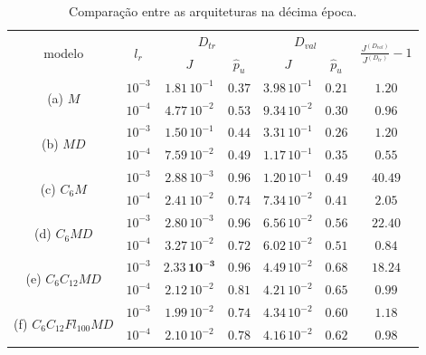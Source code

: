 \begin{table}[ht]
	\begin{center}
		\caption{Comparação entre as arquiteturas na décima época.}
		\label{tab:dinamica_inicial}
		\begin{tabular}{ |c|c|c|c|c|c|c| }
			\hline
			\multirow{2}{*}{modelo} & 
			\multirow{2}{*}{$l_r$} & 
			\multicolumn{2}{c|}{$D_{tr}$} &
			\multicolumn{2}{c|}{$D_{val}$} &
			\multirow{2}{*}{$\frac{J^{(D_{val})}}{J^{(D_{tr})}} - 1$}   \\ \cline{3-6}
			&  & $J$ & $\hat{p}_u$ & $J$ & $\hat{p}_u$  &  \\[2pt]
			\hline\hline
			\multirow{2}{*}{(a) $M$}
			& $10^{-3}$ & $1.81\,10^{-1}$ & $0.37$ & $3.98\,10^{-1}$ & $0.21$ & $1.20$ \\ \cline{2-7}
			& $10^{-4}$ & $4.77\,10^{-2}$ & $0.53$ & $9.34\,10^{-2}$ & $0.30$ & $0.96$ \\ \cline{2-7}
			
			\hline\hline
			\multirow{2}{*}{(b) $MD$}
			& $10^{-3}$ & $1.50\,10^{-1}$ & $0.44$ & $3.31\,10^{-1}$ & $0.26$ & $1.20$ \\ \cline{2-7}
			& $10^{-4}$ & $7.59\,10^{-2}$ & $0.49$ & $1.17\,10^{-1}$ & $0.35$ & $0.55$ \\ \cline{2-7}
			
			\hline\hline
			\multirow{2}{*}{(c) $C_6M$}
			& $10^{-3}$ & $2.88\,10^{-3}$ & $\mathbf{0.96}$ & $1.20\,10^{-1}$ & $0.49$ & $40.49$ \\ \cline{2-7}
			& $10^{-4}$ & $2.41\,10^{-2}$ & $0.74$ & $7.34\,10^{-2}$ & $0.41$ & $2.05$ \\ \cline{2-7}
			
			\hline\hline
			\multirow{2}{*}{(d) $C_6MD$}
			& $10^{-3}$ & $2.80\,10^{-3}$ & $\mathbf{0.96}$ & $6.56\,10^{-2}$ & $0.56$ & $22.40$ \\ \cline{2-7}
			& $10^{-4}$ & $3.27\,10^{-2}$ & $0.72$ & $6.02\,10^{-2}$ & $0.51$ & $0.84$ \\ \cline{2-7}
			
			\hline\hline
			\multirow{2}{*}{(e) $C_6C_{12}MD$}
			& $10^{-3}$ & $\mathbf{2.33\,10^{-3}}$ & $\mathbf{0.96}$ & $4.49\,10^{-2}$ & $0.68$ & $18.24$ \\ \cline{2-7}
			& $10^{-4}$ & $2.12\,10^{-2}$ & $0.81$ & $4.21\,10^{-2}$ & $0.65$ & $0.99$ \\ \cline{2-7}
			
			\hline\hline
			\multirow{2}{*}{(f) $C_6C_{12}Fl_{100}MD$}
			& $10^{-3}$ & $1.99\,10^{-2}$ & $0.74$ & $4.34\,10^{-2}$ & $0.60$ & $1.18$ \\ \cline{2-7}
			& $10^{-4}$ & $2.10\,10^{-2}$ & $0.78$ & $4.16\,10^{-2}$ & $0.62$ & $0.98$ \\ \cline{2-7}
			

\end{tabular}
\end{center}
\end{table}
